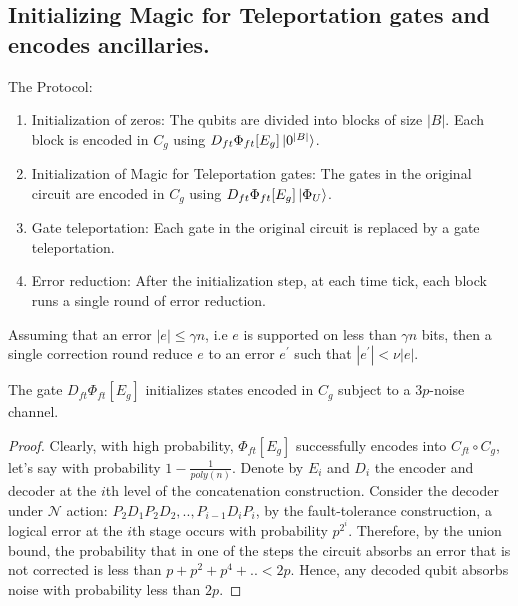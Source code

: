 \documentclass[manuscript,screen,review]{acmart}
\begin{document}
{\subsection{Initializing Magic for Teleportation gates and encodes ancillaries.}
The Protocol: \begin{enumerate}
  \item Initialization of zeros: The qubits are divided into blocks of size $|B|$. Each block is encoded in $C_{g}$ using $D_{ft} \Phi_{ft}[E_{g}] \ket{0^{|B|}}$.
  \item Initialization of Magic for Teleportation gates: The gates in the original circuit are encoded in $C_{g}$ using $D_{ft} \Phi_{ft}[E_{g}] \ket{\Phi_{U}}$.
  \item Gate teleportation: Each gate in the original circuit is replaced by a gate teleportation.
  \item Error reduction: After the initialization step, at each time tick, each block runs a single round of error reduction.
\end{enumerate}

\begin{claim}
  \label{claim:error} 
  Assuming that an error $|e| \le \gamma n $, i.e $e$ is supported on less than $\gamma n$ bits, then a single correction round reduce $e$ to an error $e^\prime$ such that $|e^{\prime}| < \nu |e|$. 
\end{claim}
\begin{claim}
  \label{claim:noisepa}
  The gate $ D_{ft} \Phi_{ft}[E_{g}]$ initializes states encoded in $C_{g}$ subject to a $3p$-noise channel.  
\end{claim}
\begin{proof}
  Clearly, with high probability, $\Phi_{ft}[E_{g}]$ successfully encodes into $C_{ft} \circ C_{g}$, let's say with probability $1 - \frac{1}{poly(n)}$. Denote by $E_{i}$ and $D_{i}$ the encoder and decoder at the $i$th level of the concatenation construction. Consider the decoder under $\mathcal{N}$ action: $P_{2}D_{1}P_{2}D_{2},..,P_{i-1}D_{i}P_{i}$, by the fault-tolerance construction, a logical error at the $i$th stage occurs with probability $p^{2^{i}}$. Therefore, by the union bound, the probability that in one of the steps the circuit absorbs an error that is not corrected is less than $p + p^{2} + p^{4} + .. < 2p$. Hence, any decoded qubit absorbs noise with probability less than $2p$.



\end{proof}}
\end{document}
